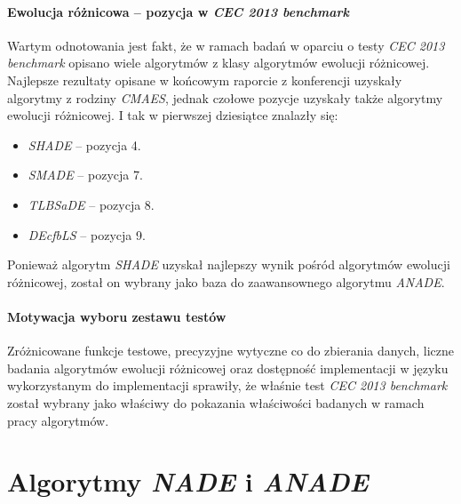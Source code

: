 \documentclass[12pt,a4paper]{report}
\begin{document}
{{{{\subsubsection{Ewolucja różnicowa -- pozycja w \emph{CEC 2013 benchmark}}
\par{
Wartym odnotowania jest fakt, że w ramach badań w oparciu o testy \emph{CEC 2013 benchmark} opisano wiele algorytmów z klasy algorytmów ewolucji różnicowej. Najlepsze rezultaty opisane w końcowym raporcie z konferencji \cite{CEC2013Comp} uzyskały algorytmy z rodziny \emph{CMAES}, jednak czołowe pozycje uzyskały także algorytmy ewolucji różnicowej. I tak w pierwszej dziesiątce znalazły się:
\begin{itemize}
\item \emph{SHADE} \cite{SHADE} -- pozycja 4.
\item \emph{SMADE} \cite{SMADE} -- pozycja 7.
\item \emph{TLBSaDE} \cite{TLBSaDE} -- pozycja 8.
\item \emph{DEcfbLS} \cite{DEcfbLS} -- pozycja 9.
\end{itemize}
}
\par{
Ponieważ algorytm \emph{SHADE} uzyskał najlepszy wynik pośród algorytmów ewolucji różnicowej, został on wybrany jako baza do zaawansownego algorytmu \emph{ANADE}.
}

\subsubsection{Motywacja wyboru zestawu testów}
\par{
Zróżnicowane funkcje testowe, precyzyjne wytyczne co do zbierania danych, liczne badania algorytmów ewolucji różnicowej oraz dostępność implementacji w języku wykorzystanym do implementacji sprawiły, że właśnie test \emph{CEC 2013 benchmark} został wybrany jako właściwy do pokazania właściwości badanych w ramach pracy algorytmów.
}

\chapter{Algorytmy \emph{NADE} i \emph{ANADE}}
}}}}
\end{document}
